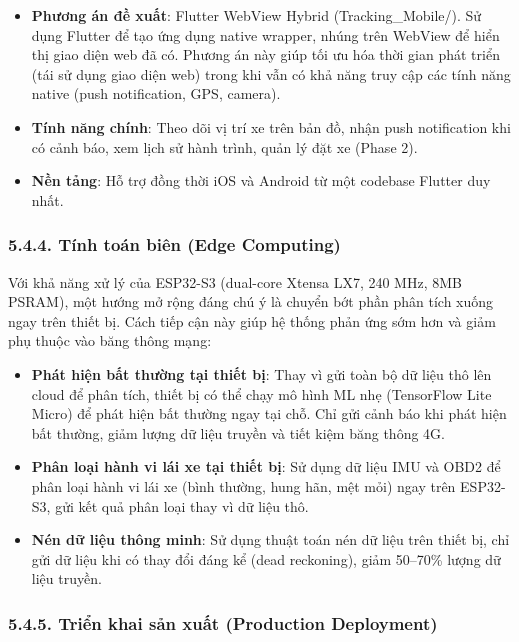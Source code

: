 \documentclass[a4paper]{extarticle}
\providecommand{\tightlist}{%
  \setlength{\itemsep}{0pt}\setlength{\parskip}{0pt}}
\begin{document}
\begin{itemize}
\tightlist
\item
  \textbf{Phương án đề xuất}: Flutter WebView Hybrid
  (Tracking\_Mobile/). Sử dụng Flutter để tạo ứng dụng native wrapper,
  nhúng trên WebView để hiển thị giao diện web đã có. Phương án này giúp
  tối ưu hóa thời gian phát triển (tái sử dụng giao diện web) trong khi
  vẫn có khả năng truy cập các tính năng native (push notification, GPS,
  camera).
\item
  \textbf{Tính năng chính}: Theo dõi vị trí xe trên bản đồ, nhận push
  notification khi có cảnh báo, xem lịch sử hành trình, quản lý đặt xe
  (Phase 2).
\item
  \textbf{Nền tảng}: Hỗ trợ đồng thời iOS và Android từ một codebase
  Flutter duy nhất.
\end{itemize}

\subsubsection{5.4.4. Tính toán biên (Edge
Computing)}\label{544-tuxednh-touxe1n-biuxean-edge-computing}

Với khả năng xử lý của ESP32-S3 (dual-core Xtensa LX7, 240 MHz, 8MB
PSRAM), một hướng mở rộng đáng chú ý là chuyển bớt phần phân tích xuống
ngay trên thiết bị. Cách tiếp cận này giúp hệ thống phản ứng sớm hơn và
giảm phụ thuộc vào băng thông mạng:

\begin{itemize}
\tightlist
\item
  \textbf{Phát hiện bất thường tại thiết bị}: Thay vì gửi toàn bộ dữ
  liệu thô lên cloud để phân tích, thiết bị có thể chạy mô hình ML nhẹ
  (TensorFlow Lite Micro) để phát hiện bất thường ngay tại chỗ. Chỉ gửi
  cảnh báo khi phát hiện bất thường, giảm lượng dữ liệu truyền và tiết
  kiệm băng thông 4G.
\item
  \textbf{Phân loại hành vi lái xe tại thiết bị}: Sử dụng dữ liệu IMU và
  OBD2 để phân loại hành vi lái xe (bình thường, hung hãn, mệt mỏi) ngay
  trên ESP32-S3, gửi kết quả phân loại thay vì dữ liệu thô.
\item
  \textbf{Nén dữ liệu thông minh}: Sử dụng thuật toán nén dữ liệu trên
  thiết bị, chỉ gửi dữ liệu khi có thay đổi đáng kể (dead reckoning),
  giảm 50--70\% lượng dữ liệu truyền.
\end{itemize}

\subsubsection{5.4.5. Triển khai sản xuất (Production
Deployment)}\label{545-triux1ec3n-khai-sux1ea3n-xuux1ea5t-production-deployment}
\end{document}
